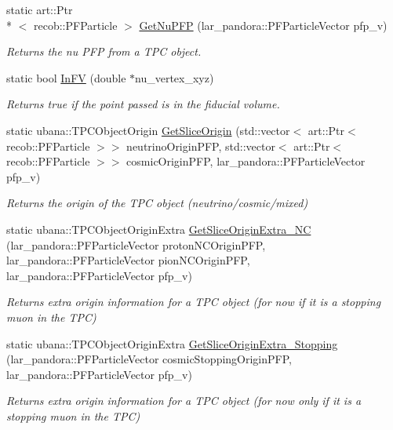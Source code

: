 \begin{DoxyCompactItemize}
static art\-::\-Ptr\\*
$<$ recob\-::\-P\-F\-Particle $>$ \hyperlink{classUBXSecHelper_a1803584104e1b6f618fe86b28aec1927}{Get\-Nu\-P\-F\-P} (lar\-\_\-pandora\-::\-P\-F\-Particle\-Vector pfp\-\_\-v)
\begin{DoxyCompactList}\small\item\em Returns the nu P\-F\-P from a T\-P\-C object. \end{DoxyCompactList}\item 
static bool \hyperlink{classUBXSecHelper_a4ff7e0d6774d5628cc2a3d19bb2d3492}{In\-F\-V} (double $\ast$nu\-\_\-vertex\-\_\-xyz)
\begin{DoxyCompactList}\small\item\em Returns true if the point passed is in the fiducial volume. \end{DoxyCompactList}\item 
static ubana\-::\-T\-P\-C\-Object\-Origin \hyperlink{classUBXSecHelper_a7f4a880c5880a678c7d0f181e92cb748}{Get\-Slice\-Origin} (std\-::vector$<$ art\-::\-Ptr$<$ recob\-::\-P\-F\-Particle $>$$>$ neutrino\-Origin\-P\-F\-P, std\-::vector$<$ art\-::\-Ptr$<$ recob\-::\-P\-F\-Particle $>$$>$ cosmic\-Origin\-P\-F\-P, lar\-\_\-pandora\-::\-P\-F\-Particle\-Vector pfp\-\_\-v)
\begin{DoxyCompactList}\small\item\em Returns the origin of the T\-P\-C object (neutrino/cosmic/mixed) \end{DoxyCompactList}\item 
static ubana\-::\-T\-P\-C\-Object\-Origin\-Extra \hyperlink{classUBXSecHelper_afe28141046a637997685e43478ea6e25}{Get\-Slice\-Origin\-Extra\-\_\-\-N\-C} (lar\-\_\-pandora\-::\-P\-F\-Particle\-Vector proton\-N\-C\-Origin\-P\-F\-P, lar\-\_\-pandora\-::\-P\-F\-Particle\-Vector pion\-N\-C\-Origin\-P\-F\-P, lar\-\_\-pandora\-::\-P\-F\-Particle\-Vector pfp\-\_\-v)
\begin{DoxyCompactList}\small\item\em Returns extra origin information for a T\-P\-C object (for now if it is a stopping muon in the T\-P\-C) \end{DoxyCompactList}\item 
static ubana\-::\-T\-P\-C\-Object\-Origin\-Extra \hyperlink{classUBXSecHelper_ae4071096536a66ccd1de84b8cc15fb12}{Get\-Slice\-Origin\-Extra\-\_\-\-Stopping} (lar\-\_\-pandora\-::\-P\-F\-Particle\-Vector cosmic\-Stopping\-Origin\-P\-F\-P, lar\-\_\-pandora\-::\-P\-F\-Particle\-Vector pfp\-\_\-v)
\begin{DoxyCompactList}\small\item\em Returns extra origin information for a T\-P\-C object (for now only if it is a stopping muon in the T\-P\-C) \end{DoxyCompactList}\item 

\end{DoxyCompactItemize}

